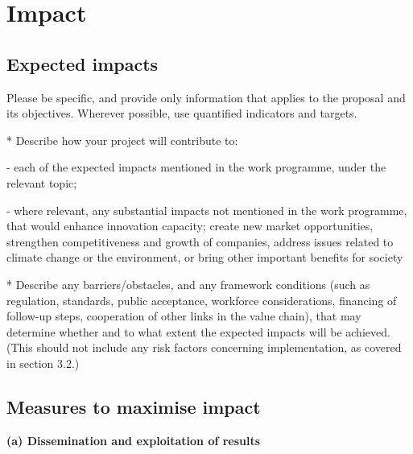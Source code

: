 \chapter{Impact}\label{chap:impact}


\section{Expected impacts}\label{sec:expected-impact}

\begin{todo}{}\color{red}
  Please be specific, and provide only information that applies to the proposal and its objectives. Wherever possible, use quantified indicators and targets.
  
  * Describe how your project will contribute to:
  
      - each of the expected impacts mentioned in the work programme, under the relevant topic;
  
      - where relevant, any substantial impacts not mentioned in the work programme, that would enhance innovation capacity; create new market opportunities, strengthen competitiveness and growth of companies, address issues related to climate change or the environment, or  bring other important benefits for society
  
  * Describe any barriers/obstacles, and any framework conditions (such as regulation, standards, public acceptance, workforce considerations, financing of follow-up steps, cooperation of other links in the value chain), that may determine whether and to what extent the expected impacts will be achieved. (This should not include any risk factors concerning implementation, as covered in section 3.2.)
\end{todo}






\section{Measures to maximise impact}

{\bf (a) Dissemination and exploitation of results}

